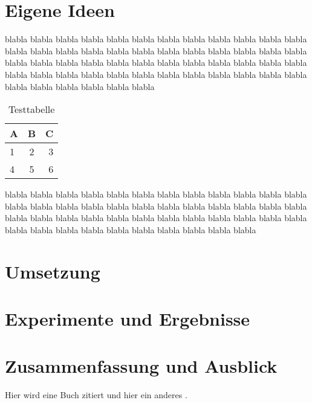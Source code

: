 \documentclass[12pt,a4paper,DIV13,pdftex,BCOR10mm,fleqn,liststotoc,bibtotoc,cleardoubleempty]{scrbook}
\begin{document}
\chapter{Eigene Ideen}
blabla blabla blabla blabla blabla blabla blabla blabla blabla blabla blabla blabla blabla blabla blabla blabla blabla blabla blabla blabla blabla blabla blabla blabla blabla blabla blabla blabla blabla blabla blabla blabla blabla blabla blabla blabla blabla blabla blabla blabla blabla blabla blabla blabla blabla blabla blabla blabla blabla blabla blabla blabla blabla blabla
\begin{table}[ht]
\centering
\begin{tabular}{|l|c|r}
  \hline
  A & B & C \\
\hline
 1 & 2 & 3  \\
\hline
 4 & 5 & 6 \\
\end{tabular}
\caption{Testtabelle}
\label{TestXYZ}
\end{table}
blabla blabla blabla blabla blabla blabla blabla blabla blabla blabla blabla blabla blabla blabla blabla blabla blabla blabla blabla blabla blabla blabla blabla blabla blabla blabla blabla blabla blabla blabla blabla blabla blabla blabla blabla blabla blabla blabla blabla blabla blabla blabla blabla blabla blabla blabla
\chapter{Umsetzung}
\chapter{Experimente und Ergebnisse}
\chapter{Zusammenfassung und Ausblick}
Hier wird eine Buch zitiert \cite{book-minimal} und hier ein anderes \cite{article-full}.

%
%
%

\backmatter
%

\nocite{*}

\end{document}
